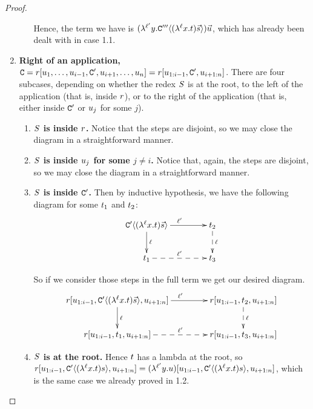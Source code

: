 \begin{proof}
\begin{enumerate}
\begin{enumerate}
    Hence, the term we have is
    $(\lambda^{\ell'} y. \mathtt{C}'''\langle(\lambda^{\ell} x. t) \vec{s}\rangle) \vec{u}$,
    which has already been dealt with in case 1.1.
    \end{enumerate}
\item {\bf Right of an application,
  $\mathtt{C} = r[u_1, \hdots, u_{i-1}, \mathtt{C}',u_{i+1}, \hdots, u_n] =
          r[u_{1:i-1}, \mathtt{C}',u_{i+1:n}]$}.
  There are four subcases, depending on whether the redex $S$ is
  at the root, to the left of the application (that is, inside $r$),
  or to the right of the application (that is, either inside $\mathtt{C}'$ or $u_j$ for some $j$).
  \begin{enumerate}
  \item {\bf $S$ is inside $r$.}
    Notice that the steps are disjoint, so we may close the diagram in a straightforward manner.
  \item {\bf $S$ is inside $u_j$ for some $j \neq i$.}
    Notice that, again, the steps are disjoint,
    so we may close the diagram in a straightforward manner.
  \item {\bf $S$ is inside $\mathtt{C}'$.} Then by inductive hypothesis,
        we have the following diagram for some $t_1$ and $t_2$:
        \[
        \xymatrix@C=1.5cm{
            \contwoof{(\lamp{\lab}{\var}{\tm}) \ls{\tmtwo}}
                            \ar[d]^{\lab}
                            \ar[r]^{\lab'} &
            {\tm_2} \ar@{-->}[d]^{\lab} \\ 
            {\tm_1} \ar@{-->}[r]^{\lab'} &
            {\tm_3} \\
        }
        \]
        
        So if we consider those steps in the full term we get our desired diagram.
        \[
        \xymatrix@C=1.5cm{
          \tmfour \lset{\tmthree_{1:i-1}, \contwoof{(\lamp{\lab}{\var}{\tm}) \ls{\tmtwo}}, \tmthree_{i+1:n}}
                          \ar[d]^{\lab}
                          \ar[r]^{\lab'} &
          \tmfour \lset{\tmthree_{1:i-1}, \tm_2, \tmthree_{i+1:n}} \ar@{-->}[d]^{\lab} \\ 
          \tmfour \lset{\tmthree_{1:i-1}, \tm_1, \tmthree_{i+1:n}} \ar@{-->}[r]^{\lab'} &
          \tmfour \lset{\tmthree_{1:i-1}, \tm_3, \tmthree_{i+1:n}} \\
        }
        \]
  \item {\bf $S$ is at the root.}
    Hence $t$ has a lambda at the root, so
    $r[u_{1:i-1}, \mathtt{C}'\langle(\lambda^{\ell} x. t)s\rangle,u_{i+1:n}] =
     (\lambda^{\ell'} y. u) [u_{1:i-1}, \mathtt{C}'\langle(\lambda^{\ell} x. t)s\rangle,u_{i+1:n}]$,
     which is the same case we already proved in 1.2.
  \end{enumerate}
\end{enumerate}
\end{proof}

